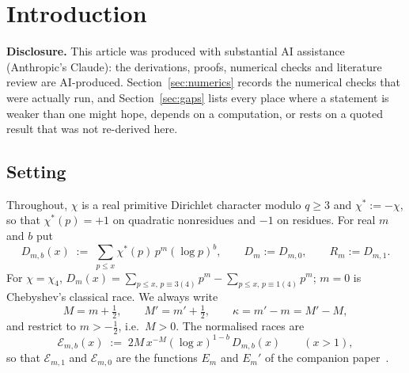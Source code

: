\documentclass[11pt]{amsart}
\theoremstyle{definition}
\numberwithin{equation}{section}
\newcommand{\cE}{\mathcal E}
\begin{document}
\maketitle

\section{Introduction}\label{sec:intro}

\noindent\textbf{Disclosure.} This article was produced with
substantial AI assistance (Anthropic's Claude): the derivations,
proofs, numerical checks and literature review are AI-produced.
Section~\ref{sec:numerics} records the numerical checks that were
actually run, and Section~\ref{sec:gaps} lists every place where a
statement is weaker than one might hope, depends on a computation, or
rests on a quoted result that was not re-derived here.

\subsection{Setting}\label{subsec:setting}

Throughout, $\chi$ is a real primitive Dirichlet character modulo
$q\ge3$ and $\chi^*:=-\chi$, so that $\chi^*(p)=+1$ on quadratic
nonresidues and $-1$ on residues. For real $m$ and $b$ put
\[
D_{m,b}(x)\;:=\;\sum_{p\le x}\chi^*(p)\,p^{m}(\log p)^{b},
\qquad
D_m:=D_{m,0},\qquad R_m:=D_{m,1}.
\]
For $\chi=\chi_4$, $D_m(x)=\sum_{p\le x,\,p\equiv3(4)}p^m
-\sum_{p\le x,\,p\equiv1(4)}p^m$; $m=0$ is Chebyshev's classical race.
We always write
\[
M=m+\tfrac12,\qquad M'=m'+\tfrac12,\qquad \kappa=m'-m=M'-M ,
\]
and restrict to $m>-\tfrac12$, i.e.\ $M>0$. The normalised races are
\begin{equation}\label{eq:normalised}
\cE_{m,b}(x)\;:=\;2M\,x^{-M}(\log x)^{1-b}\,D_{m,b}(x)\qquad(x>1),
\end{equation}
so that $\cE_{m,1}$ and $\cE_{m,0}$ are the functions $E_m$ and
$E_m'$ of the companion paper~\cite{WR}.
\end{document}
